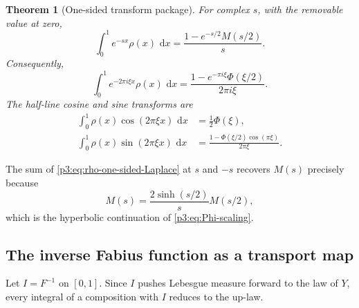 \documentclass[11pt,oneside]{article}
\newtheorem{theorem}{Theorem}[section]
\theoremstyle{definition}
\newcommand{\dd}{\,\mathrm d}
\begin{document}
\begin{theorem}[One-sided transform package]\label{p3:thm:one-sided}
For complex \(s\), with the removable value at zero,
\begin{equation}
 \boxed{
 \int_0^1e^{-sx}\rho(x)\,\dd x
 =\frac{1-e^{-s/2}M(s/2)}{s}.
 }                                                           \label{p3:eq:rho-one-sided-Laplace}
\end{equation}
Consequently,
\begin{equation}
 \boxed{
 \int_0^1e^{-2\pi i\xi x}\rho(x)\,\dd x
 =\frac{1-e^{-\pi i\xi}\Phi(\xi/2)}{2\pi i\xi}.
 }                                                           \label{p3:eq:rho-one-sided-Fourier}
\end{equation}
The half-line cosine and sine transforms are
\begin{align}
 \int_0^1\rho(x)\cos(2\pi\xi x)\,\dd x
 &=\frac12\Phi(\xi),                                        \label{p3:eq:rho-half-cos}\\
 \int_0^1\rho(x)\sin(2\pi\xi x)\,\dd x
 &=\frac{1-\Phi(\xi/2)\cos(\pi\xi)}{2\pi\xi}.             \label{p3:eq:rho-half-sin}
\end{align}
\end{theorem}

The sum of \eqref{p3:eq:rho-one-sided-Laplace} at \(s\) and \(-s\) recovers
\(M(s)\) precisely because
\begin{equation}
 M(s)=\frac{2\sinh(s/2)}{s}M(s/2),                           \label{p3:eq:M-scaling}
\end{equation}
which is the hyperbolic continuation of \eqref{p3:eq:Phi-scaling}.

\subsection{The inverse Fabius function as a transport map}

Let \(I=F^{-1}\) on \([0,1]\).  Since \(I\) pushes Lebesgue measure forward to the law
of \(Y\), every integral of a composition with \(I\) reduces to the up-law.
\end{document}
